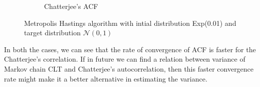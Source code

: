 \documentclass{article}
\begin{document}
\begin{figure}[H]
\begin{subfigure}[b]{0.4\linewidth}
			\caption{Chatterjee's ACF}
		\end{subfigure}
		\caption{Metropolis Hastings algorithm with intial distribution Exp(0.01) and target distribution $\mathcal{N}(0, 1)$}
		\label{fig:mh_acf}
	\end{figure}

	In both the cases, we can see that the rate of convergence of ACF is faster for the Chatterjee's correlation.
	If in future we can find a relation between variance of Markov chain CLT and Chatterjee's autocorrelation,
	then this faster convergence rate might make it a better alternative in estimating the variance.


\end{document}
